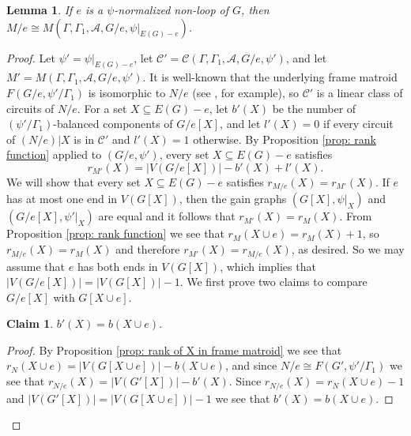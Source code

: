 \documentclass[12pt]{article}
\newtheorem{claim}{Claim}[theorem]
\newtheorem{lemma}[theorem]{Lemma}
\theoremstyle{definition}
\newcommand{\cA}{\mathcal{A}}
\newcommand{\cC}{\mathcal{C}}
\begin{document}
\begin{lemma} \label{lem: contraction of a non-loop}
If $e$ is a $\psi$-normalized non-loop of $G$, then $M / e \cong M(\Gamma, \Gamma_1, \cA, G/ e, \psi|_{E(G) - e})$.
\end{lemma}
\begin{proof}
Let $\psi' = \psi|_{E(G) - e}$, let $\cC' = \cC(\Gamma, \Gamma_1, \cA, G/e, \psi')$, and let $M' = M(\Gamma, \Gamma_1, \cA, G/e, \psi')$.
It is well-known that the underlying frame matroid $F(G/e, \psi'/\Gamma_1)$ is isomorphic to $N/e$ (see \cite[Proposition 2.4]{Funk-Pivotto-Slilaty-2022}, for example), so $\cC'$ is a linear class of circuits of $N/e$.
For a set $X \subseteq E(G) - e$, let $b'(X)$ be the number of $(\psi'/\Gamma_1)$-balanced components of $G/e[X]$, and let $l'(X) = 0$ if every circuit of $(N/e)|X$ is in $\cC'$ and $l'(X) = 1$ otherwise.
By Proposition \ref{prop: rank function} applied to $(G/e, \psi')$, every set $X \subseteq E(G) - e$ satisfies
$$r_{M'}(X) = |V(G/e[X])| - b'(X) + l'(X).$$
We will show that every set $X \subseteq E(G) - e$ satisfies $r_{M/e}(X) = r_{M'}(X)$.
If $e$ has at most one end in $V(G[X])$, then the gain graphs $(G[X], \psi|_X)$ and $(G/e[X], \psi'|_X)$ are equal and it follows that $r_{M'}(X) = r_M(X)$.
From Proposition \ref{prop: rank function} we see that $r_M(X \cup e) = r_M(X) + 1$, so $r_{M/e}(X) = r_M(X)$ and therefore $r_{M'}(X) = r_{M/e}(X)$, as desired.
So we may assume that $e$ has both ends in $V(G[X])$, which implies that $|V(G/e[X])| = |V(G[X])| - 1$.
We first prove two claims to compare $G/e[X]$ with $G[X \cup e]$.


\begin{claim} \label{claim: b-value comparison in non-loop case}
$b'(X) = b(X \cup e)$.
\end{claim}
\begin{proof}
By Proposition \ref{prop: rank of X in frame matroid} we see that $r_N(X \cup e) = |V(G[X \cup e])| - b(X \cup e)$, and since $N/e \cong F(G', \psi'/\Gamma_1)$ we see that $r_{N/e}(X) = |V(G'[X])| - b'(X)$.
Since $r_{N/e}(X) = r_N(X \cup e) - 1$ and $|V(G'[X])| = |V(G[X \cup e])| - 1$ we see that $b'(X) = b(X \cup e)$.
\end{proof}



\end{proof}
\end{document}
